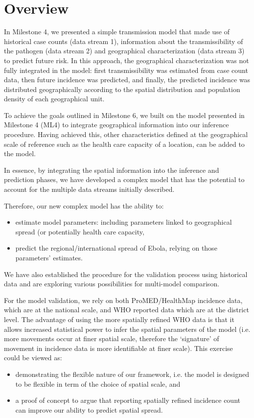 \documentclass[11pt,]{article}
\begin{document}
\section{Overview}

In Milestone 4, we presented a simple transmission model that made use of
historical case counts (data stream 1), information about the
transmissibility of the pathogen (data stream 2) and geographical
characterization (data stream 3) to predict future risk. 
In this approach, the geographical characterization was not fully integrated in the model:
first transmissibility was estimated from case count data, then future incidence was predicted, and 
finally, the predicted incidence was distributed geographically according to the spatial distribution 
and population density of each geographical unit.

To achieve the goals outlined in Milestone 6, we built on the model presented in Milestone 4 
(ML4) to integrate geographical information into our inference procedure.
Having achieved this, other characteristics defined at the geographical
scale of reference such as the health care capacity of a location, can be 
added to the model.

In essence, by integrating the spatial information into the inference
and prediction phases, we have developed a complex model that has the potential to
account for the multiple data streams initially described.

Therefore, our new complex model has the ability to:
\begin{itemize}
\item estimate model parameters: including parameters linked to geographical spread (or
potentially health care capacity,
\item predict the regional/international spread of Ebola, relying on those parameters' estimates. 
\end{itemize}

We have also established the procedure for the validation process
using historical data and are exploring various possibilities for multi-model comparison. 

For the model validation, we rely on both ProMED/HealthMap incidence data, which are 
at the national scale, and WHO reported data which are at the district level. The advantage 
of using the more spatially refined WHO data is that it allows increased statistical power to 
infer the spatial parameters of the model (i.e. more movements occur at finer spatial scale, 
therefore the `signature' of movement in incidence data is more identifiable at finer scale).
This exercise could be viewed as:
\begin{itemize}
\item demonstrating the flexible nature of our framework, i.e. 
the model is designed to be flexible in term of the choice of spatial scale, and
\item a proof of concept to argue that reporting spatially refined incidence count can improve our ability to
predict spatial spread.
\end{itemize}
\end{document}
